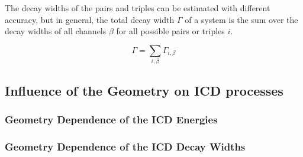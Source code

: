 The decay widths of the pairs and triples can be estimated with
different accuracy, but in general, the total decay width $\Gamma$ of
a system is the sum over the decay widths of all channels $\beta$ for
all possible pairs or triples $i$.

\begin{equation}
  \Gamma = \sum\limits_{i,\beta}\Gamma_{i,\beta}
\end{equation}


\subsection{Influence of the Geometry on ICD processes}
\subsubsection{Geometry Dependence of the ICD Energies}

\begin{figure}[h]
 \centering
 
 \caption{}
\end{figure}

\subsubsection{Geometry Dependence of the ICD Decay Widths}
